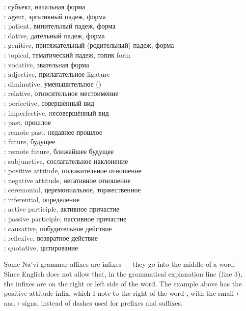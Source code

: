 \begin{multicols}{2}
\noindent{}: субъект, начальная форма \\
: agent, эргативный падеж, форма  \\
: patient, винительный падеж, форма  \\
: dative, дательный падеж, форма  \\
: genitive, притяжательный (родительный) падеж, форма  \\
: topical, тематический падеж, топик  form \\
: vocative, звательная форма  \\
: adjective, прилагательное  ligature\\
: diminutive, уменьшительное () \\
: relative, относительное местоимение  \\
: perfective, совершённый вид \\
: imperfective, несовершённый вид \\
: past, прошлое \\
: remote past, недавнее прошлое \\
: future, будущее \\
: remote future, ближайшее будущее \\
: subjunctive, сослагательное наклонение \\
: positive attitude, положительное отношение \\
: negative attitude, негативное отношение \\
: ceremonial, церемониальное, торжественное \\
: inferential, определение \\
: active participle, активное причастие \\
: passive participle, пассивное причастие \\
: causative, побудительное действие \\
: reflexive, возвратное действие \\
: quotative, цитирование 
\end{multicols}

\noindent Some Na'vi grammar affixes are infixes — they go into the
middle of a word.  Since English does not allow that, in the
grammatical explanation line (line 3), the infixes are on the right or
left side of the word.  The example above has the positive attitude
infix, which I note to the right of the word , with the small ‹
and › signs, instead of dashes used for prefixes and suffixes.

